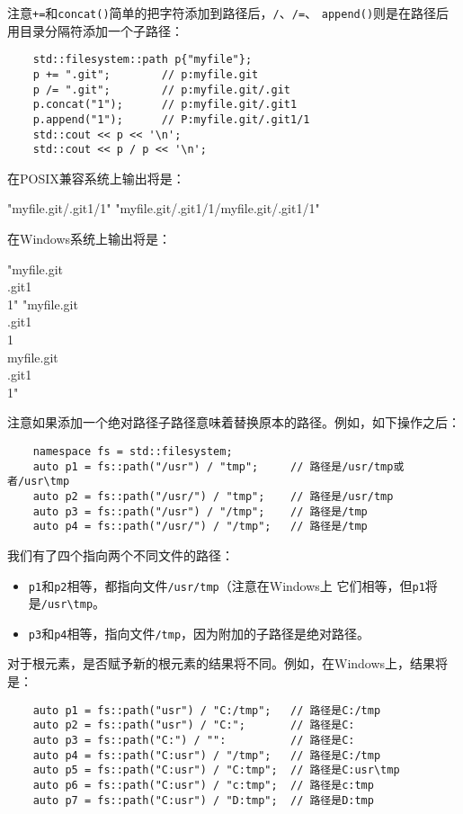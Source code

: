 注意\texttt{+=}和\texttt{concat()}简单的把字符添加到路径后，\texttt{/}、\texttt{/=}、
\texttt{append()}则是在路径后用目录分隔符添加一个子路径：
\begin{lstlisting}
    std::filesystem::path p{"myfile"};
    p += ".git";        // p:myfile.git
    p /= ".git";        // p:myfile.git/.git
    p.concat("1");      // p:myfile.git/.git1
    p.append("1");      // P:myfile.git/.git1/1
    std::cout << p << '\n';
    std::cout << p / p << '\n';
\end{lstlisting}
在POSIX兼容系统上输出将是：
\begin{blacklisting}
    "myfile.git/.git1/1"
    "myfile.git/.git1/1/myfile.git/.git1/1"
\end{blacklisting}
在Windows系统上输出将是：
\begin{blacklisting}
    "myfile.git\\.git1\\1"
    "myfile.git\\.git1\\1\\myfile.git\\.git1\\1"
\end{blacklisting}
注意如果添加一个绝对路径子路径意味着替换原本的路径。例如，如下操作之后：
\begin{lstlisting}
    namespace fs = std::filesystem;
    auto p1 = fs::path("/usr") / "tmp";     // 路径是/usr/tmp或者/usr\tmp
    auto p2 = fs::path("/usr/") / "tmp";    // 路径是/usr/tmp
    auto p3 = fs::path("/usr") / "/tmp";    // 路径是/tmp
    auto p4 = fs::path("/usr/") / "/tmp";   // 路径是/tmp
\end{lstlisting}
我们有了四个指向两个不同文件的路径：
\begin{itemize}
    \item \texttt{p1}和\texttt{p2}相等，都指向文件\texttt{/usr/tmp}（注意在Windows上
    它们相等，但\texttt{p1}将是\texttt{/usr\textbackslash tmp}。
    \item \texttt{p3}和\texttt{p4}相等，指向文件\texttt{/tmp}，因为附加的子路径是绝对路径。
\end{itemize}
对于根元素，是否赋予新的根元素的结果将不同。例如，在Windows上，结果将是：
\begin{lstlisting}
    auto p1 = fs::path("usr") / "C:/tmp";   // 路径是C:/tmp
    auto p2 = fs::path("usr") / "C:";       // 路径是C:
    auto p3 = fs::path("C:") / "":          // 路径是C:
    auto p4 = fs::path("C:usr") / "/tmp";   // 路径是C:/tmp
    auto p5 = fs::path("C:usr") / "C:tmp";  // 路径是C:usr\tmp
    auto p6 = fs::path("C:usr") / "c:tmp";  // 路径是c:tmp
    auto p7 = fs::path("C:usr") / "D:tmp";  // 路径是D:tmp
\end{lstlisting}
